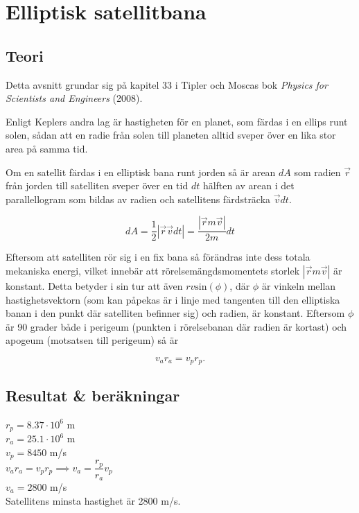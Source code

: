 \section*{\centering Elliptisk satellitbana}

\subsection*{Teori}
Detta avsnitt grundar sig på kapitel 33 i Tipler och Moscas bok \textit{Physics for Scientists and Engineers} (2008).
\vspace{5mm}

Enligt Keplers andra lag är hastigheten för en planet, som färdas i en ellips runt solen, sådan att en radie från solen till planeten alltid sveper över en lika stor area på samma tid.

Om en satellit färdas i en elliptisk bana runt jorden så är arean $dA$ som radien $\Vec{r}$ från jorden till satelliten sveper över en tid $dt$ hälften av arean i det parallellogram som bildas av radien och satellitens färdsträcka $\Vec{v}dt$.

\begin{equation}
    dA = \dfrac{1}{2} \left|\Vec{r}\Vec{v}dt \right| =\dfrac{\left|\Vec{r}m\Vec{v} \right|}{2m}dt 
\end{equation}

Eftersom att satelliten rör sig i en fix bana så förändras inte dess totala mekaniska energi, vilket innebär att rörelsemängdsmomentets storlek $\left|\Vec{r}m\Vec{v} \right|$ är konstant. Detta betyder i sin tur att även $rv\text{sin}(\phi)$, där $\phi$ är vinkeln mellan hastighetsvektorn (som kan påpekas är i linje med tangenten till den elliptiska banan i den punkt där satelliten befinner sig) och radien, är konstant. Eftersom $\phi$ är 90 grader både i perigeum (punkten i rörelsebanan där radien är kortast) och apogeum (motsatsen till perigeum) så är

\begin{equation}
    v_a r_a = v_p r_p.
\end{equation}


\subsection*{Resultat \& beräkningar}
$r_p =  8.37\cdot10^{6}$ m \\
$r_a =  25.1\cdot10^{6}$ m \\
$v_p =  8450$ m/s \\
$v_a r_a = v_p r_p \implies v_a = \dfrac{r_p}{r_a}v_{p}$ \\   
$v_a = 2800$ m/s \\
Satellitens minsta hastighet är 2800 m/s.

